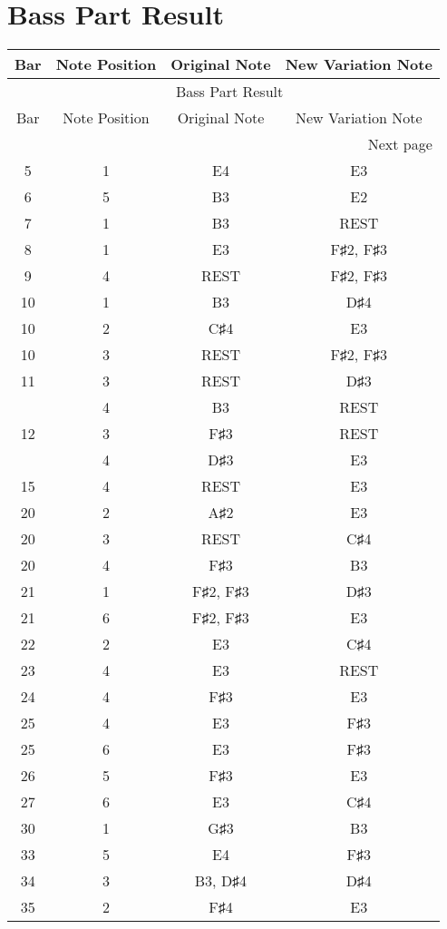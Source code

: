 \documentclass{article}
\begin{document}
\section*{Bass Part Result}
\begin{longtable}{|c|c|c|c|}
\hline
Bar & Note Position & Original Note & New Variation Note \\ \hline
\endfirsthead
\multicolumn{4}{c}{{\tablename\ \thetable{} Bass Part Result}} \\
\hline
Bar & Note Position & Original Note & New Variation Note \\ \hline
\hline
\endhead
\hline
\multicolumn{4}{r}{Next page}
\endfoot
\hline
\endlastfoot
\hline
4 & 3 & D♯4 & B3, D♯4 \\ 
\hline
5 & 1 & E4 & E3 \\ 
\hline
6 & 5 & B3 & E2 \\ 
\hline
7 & 1 & B3 & REST \\ 
\hline
8 & 1 & E3 & F♯2, F♯3 \\ 
\hline
9 & 4 & REST & F♯2, F♯3 \\ 
\hline
10 & 1 & B3 & D♯4 \\ 
\hline
10 & 2 & C♯4 & E3 \\ 
\hline
10 & 3 & REST & F♯2, F♯3 \\ 
\hline
11 & 3 & REST & D♯3 \\ 
  & 4 & B3 & REST \\ 
\hline
12 & 3 & F♯3 & REST \\ 
  & 4 & D♯3 & E3 \\ 
\hline
15 & 4 & REST & E3 \\ 
\hline
20 & 2 & A♯2 & E3 \\ 
\hline
20 & 3 & REST & C♯4 \\ 
\hline
20 & 4 & F♯3 & B3 \\ 
\hline
21 & 1 & F♯2, F♯3 & D♯3 \\ 
\hline
21 & 6 & F♯2, F♯3 & E3 \\ 
\hline
22 & 2 & E3 & C♯4 \\ 
\hline
23 & 4 & E3 & REST \\ 
\hline
24 & 4 & F♯3 & E3 \\ 
\hline
25 & 4 & E3 & F♯3 \\ 
\hline
25 & 6 & E3 & F♯3 \\ 
\hline
26 & 5 & F♯3 & E3 \\ 
\hline
27 & 6 & E3 & C♯4 \\ 
\hline
30 & 1 & G♯3 & B3 \\ 
\hline
33 & 5 & E4 & F♯3 \\ 
\hline
34 & 3 & B3, D♯4 & D♯4 \\ 
\hline
35 & 2 & F♯4 & E3 \\ 
\hline
\end{longtable}
\end{document}
